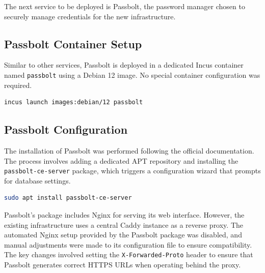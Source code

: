 The next service to be deployed is Passbolt, the password manager chosen to securely manage credentials for the new infrastructure.

\subsection*{Passbolt Container Setup}

Similar to other services, Passbolt is deployed in a dedicated Incus container named \texttt{passbolt} using a Debian 12 image. No special container configuration was required.

\begin{lstlisting}[language=bash,caption={Creating the Passbolt container.}]
incus launch images:debian/12 passbolt
\end{lstlisting}

\subsection*{Passbolt Configuration}

The installation of Passbolt was performed following the official documentation\cite{passbolt-install-debian}. The process involves adding a dedicated APT repository and installing the \texttt{passbolt-ce-server} package, which triggers a configuration wizard that prompts for database settings.

\begin{lstlisting}[language=bash,caption={Installing Passbolt CE server package.}]
sudo apt install passbolt-ce-server
\end{lstlisting}

Passbolt's package includes Nginx for serving its web interface. However, the existing infrastructure uses a central Caddy instance as a reverse proxy. The automated Nginx setup provided by the Passbolt package was disabled, and manual adjustments were made to its configuration file to ensure compatibility. The key changes involved setting the \texttt{X-Forwarded-Proto} header to ensure that Passbolt generates correct HTTPS URLs when operating behind the proxy.

